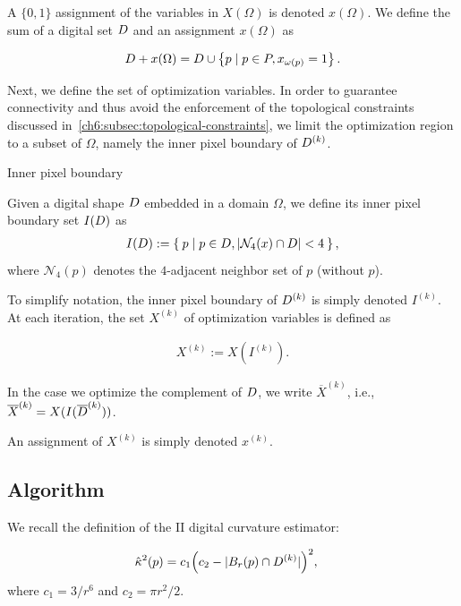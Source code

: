 A $\{0,1\}$ assignment of the variables in $X(\Omega)$ is denoted $x(\Omega)$. We define the sum of a digital set $D$ and an assignment $x(\Omega)$ as

\begin{align*}
	D + x(\Omega) = D \cup \left\{ p \; | \; p \in P, x_{\omega(p)}=1 \right\}.
\end{align*}

Next, we define the set of optimization variables. In order to guarantee connectivity and thus avoid the enforcement of the topological constraints discussed in~\cref{ch6:subsec:topological-constraints}, we limit the optimization region to a subset of $\Omega$, namely the inner pixel boundary of  $D^{(k)}$.

\begin{definition}{Inner pixel boundary}

Given a digital shape $D$ embedded in a domain $\Omega$, we define its inner pixel boundary set $I(D)$ as
\begin{align*}
	I(D) := \left\{ \: p \; | \; p \in D, |\mathcal{N}_4(x) \cap D|<4 \: \right\},
\end{align*}
where $\mathcal{N}_4(p)$ denotes the $4$-adjacent neighbor set of $p$ (without $p$). 
\end{definition}


To simplify notation, the inner pixel boundary of $D^{(k)}$ is simply denoted $I^{(k)}$. At each iteration, the set $X^{(k)}$ of optimization variables is defined as

\begin{align*}
	X^{(k)} := X(I^{(k)}).
\end{align*}

In the case we optimize the complement of $D$, we write $\overline{X}^{(k)}$, i.e., $\overline{X}^{(k)} = X(I(\overline{D}^ {(k)}))$.

An assignment of $X^{(k)}$ is simply denoted $x^{(k)}$. 


\subsection{Algorithm}
\label{ch7:subsec:algorithm}

We recall the definition of the II digital curvature estimator:

\begin{align}
	\hat{\kappa}^2(p) &= c_1\Big( c_2 - | B_r(p) \cap D^{(k)} | \Big)^2, 
	\label{eq:curvature-estimator-pixels}
\end{align}
where $c_1=3/r^6$ and $c_2=\pi r^2/2$. 

